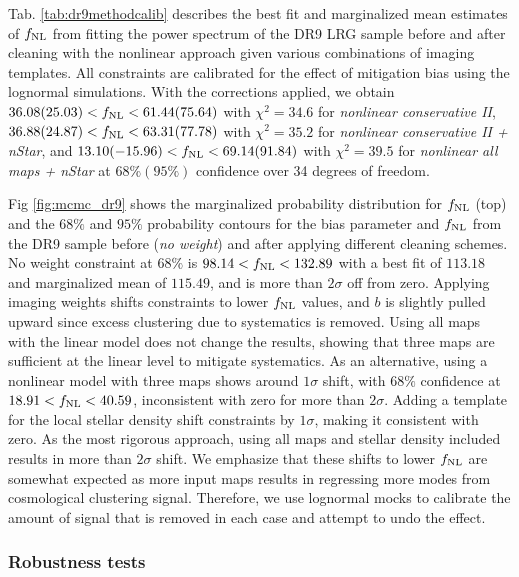 Tab. \ref{tab:dr9methodcalib} describes the best fit and marginalized mean estimates of $f_{\rm NL}$ from fitting the power spectrum of the DR9 LRG sample before and after cleaning with the nonlinear approach given various combinations of imaging templates. All constraints are calibrated for the effect of mitigation bias using the lognormal simulations. With the corrections applied, we obtain $36.08 (25.03) < f_{\rm NL} < 61.44(75.64)$ with $\chi^{2}=34.6$ for \textit{nonlinear conservative II}, $36.88(24.87) < f_{\rm NL} < 63.31(77.78)$ with $\chi^{2}=35.2$ for \textit{nonlinear conservative II + nStar}, and $13.10(-15.96) < f_{\rm NL} < 69.14(91.84)$ with $\chi^{2}=39.5$ for \textit{nonlinear all maps + nStar} at $68\% (95\%)$ confidence over 34 degrees of freedom. 

Fig \ref{fig:mcmc_dr9} shows the marginalized probability distribution for $f_{\rm NL}$ (top) and the $68\%$ and $95\%$ probability contours for the bias parameter and $f_{\rm NL}$ from the DR9 sample before (\textit{no weight}) and after applying different cleaning schemes. No weight constraint at $68\%$ is $98.14<f_{\rm NL}<132.89$ with a best fit of $113.18$ and marginalized mean of $115.49$, and is more than $2\sigma$ off from zero. Applying imaging weights shifts constraints to lower $f_{\rm NL}$ values, and $b$ is slightly pulled upward since excess clustering due to systematics is removed. Using all maps with the linear model does not change the results, showing that three maps are sufficient at the linear level to mitigate systematics.  As an alternative, using a nonlinear model with three maps shows around $1\sigma$ shift, with $68\%$ confidence at $18.91<f_{\rm NL}<40.59$, inconsistent with zero for more than $2\sigma$. Adding a template for the local stellar density shift constraints by $1\sigma$, making it consistent with zero. As the most rigorous approach, using all maps and stellar density included results in more than $2\sigma$ shift. We emphasize that these shifts to lower $f_{\rm NL}$ are somewhat expected as more input maps results in regressing more modes from cosmological clustering signal. Therefore, we use lognormal mocks to calibrate the amount of signal that is removed in each case and attempt to undo the effect.



\subsubsection{Robustness tests}

